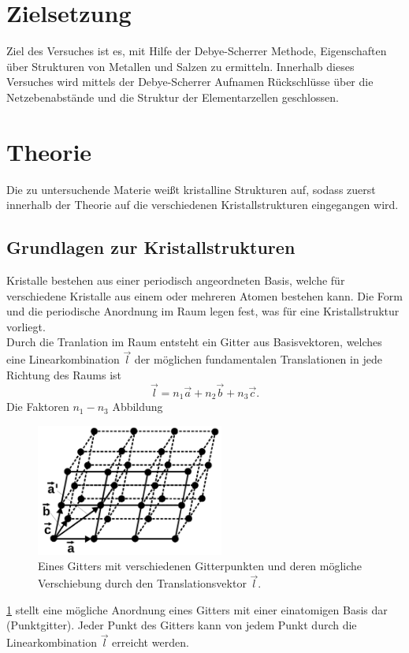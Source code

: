 \section{Zielsetzung}
Ziel des Versuches ist es, mit Hilfe der Debye-Scherrer Methode, Eigenschaften
über Strukturen von Metallen und Salzen zu ermitteln. Innerhalb dieses
Versuches wird mittels der Debye-Scherrer Aufnamen Rückschlüsse über die
Netzebenabstände und die Struktur der Elementarzellen geschlossen.


\section{Theorie}
\label{sec:Theorie}
Die zu untersuchende Materie weißt kristalline Strukturen auf, sodass zuerst
innerhalb der Theorie auf die verschiedenen Kristallstrukturen eingegangen wird.\\
\subsection{Grundlagen zur Kristallstrukturen}
Kristalle bestehen aus einer periodisch angeordneten Basis, welche für
verschiedene Kristalle aus einem oder mehreren Atomen bestehen kann.
Die Form und die periodische Anordnung im Raum legen fest,
was für eine Kristallstruktur vorliegt. \\
Durch die Tranlation im Raum entsteht ein Gitter aus Basisvektoren, welches
eine Linearkombination $\vec l$ der möglichen fundamentalen Translationen in
jede Richtung des Raums ist
$$ \vec l = n_1 \vec a + n_2 \vec b + n_3 \vec c .$$
Die Faktoren $n_1-n_3 $
Abbildung
\begin{figure}
    \centering
    \includegraphics[width=0.55\textwidth]{ressources/gitter.png}
    \caption{Eines Gitters mit verschiedenen Gitterpunkten und deren mögliche
    Verschiebung durch den Translationsvektor $\vec l$.}
    \label{fig_gitter}
\end{figure}
\ref{fig_gitter}
 stellt eine mögliche Anordnung eines Gitters mit
einer einatomigen Basis dar (Punktgitter). Jeder Punkt des Gitters kann von
jedem Punkt durch die Linearkombination $\vec l$ erreicht werden.
